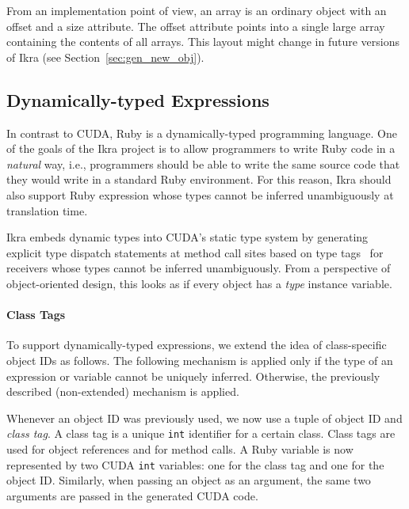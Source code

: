 \documentclass[preprint]{sigplanconf}
\begin{document}
From an implementation point of view, an array is an ordinary object with an offset and a size attribute. The offset attribute points into a single large array containing the contents of all arrays. This layout might change in future versions of Ikra (see Section~\ref{sec:gen_new_obj}).


\subsection{Dynamically-typed Expressions}
\label{sec:polymorphic}
In contrast to CUDA, Ruby is a dynamically-typed programming language. One of the goals of the Ikra project is to allow programmers to write Ruby code in a \emph{natural} way, i.e., programmers should be able to write the same source code that they would write in a standard Ruby environment. For this reason, Ikra should also support Ruby expression whose types cannot be inferred unambiguously at translation time.

Ikra embeds dynamic types into CUDA's static type system by generating explicit type dispatch statements at method call sites based on type tags~\cite{Abadi:1989:DTS:75277.75296} for receivers whose types cannot be inferred unambiguously. From a perspective of object-oriented design, this looks as if every object has a \emph{type} instance variable.

\paragraph{Class Tags}
To support dynamically-typed expressions, we extend the idea of class-specific object IDs as follows. The following mechanism is applied only if the type of an expression or variable cannot be uniquely inferred. Otherwise, the previously described (non-extended) mechanism is applied. 

Whenever an object ID was previously used, we now use a tuple of object ID and \emph{class tag}. A class tag is a unique \texttt{int} identifier for a certain class. Class tags are used for object references and for method calls. A Ruby variable is now represented by two CUDA \texttt{int} variables: one for the class tag and one for the object ID. Similarly, when passing an object as an argument, the same two arguments are passed in the generated CUDA code.
\end{document}
